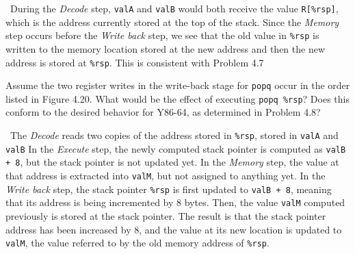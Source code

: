 \documentclass[12pt]{article}
\newenvironment{ex}[2][Exercise]{\begin{trivlist}
		\item[\hskip \labelsep {\bfseries #1}\hskip \labelsep {\bfseries #2.}]}{\end{trivlist}}
\newenvironment{sol}[1][Solution]{\begin{trivlist}
		\item[\hskip \labelsep {\bfseries #1:}]}{\end{trivlist}}
\begin{document}
\begin{sol}
	\
	During the \emph{Decode} step, \texttt{valA} and \texttt{valB} would both
	receive the value \texttt{R[\%rsp]}, which is the address currently stored
	at the top of the stack. Since the \emph{Memory} step occurs before the
	\emph{Write back} step, we see that the old value in \texttt{\%rsp} is
	written to the memory location stored at the new address and then the new
	address is stored at \texttt{\%rsp}. This is consistent with Problem 4.7
\end{sol}

\begin{ex}{4.16}
	Assume the two register writes in the write-back stage for \texttt{popq} occur
	in the order listed in Figure 4.20. What would be the effect of executing
	\texttt{popq \%rsp}? Does this conform to the desired behavior for Y86-64,
	as determined in Problem 4.8?
\end{ex}

\begin{sol}
	\
	The \emph{Decode} reads two copies of the address stored in \texttt{\%rsp},
	stored in \texttt{valA} and \texttt{valB}
	In the \emph{Execute} step, the newly computed stack pointer is computed as
	\texttt{valB + 8}, but the stack pointer is not updated yet.
	In the \emph{Memory} step, the value at that address is extracted into
	\texttt{valM}, but not assigned to anything yet. In the \emph{Write back} step, the
	stack pointer \texttt{\%rsp} is first updated to \texttt{valB + 8}, meaning that
	its address is being incremented by 8 bytes. Then, the value \texttt{valM}
	computed previously is stored at the stack pointer. The result is that the
	stack pointer address has been increased by 8, and the value at its new location
	is updated to \texttt{valM}, the value referred to by the old memory address
	of \texttt{\%rsp}.
\end{sol}
\end{document}
